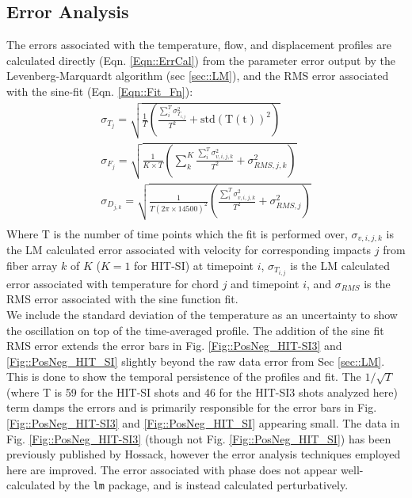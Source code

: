 \subsection{Error Analysis}\label{sec:ErrorAnal}
\hspace*{4ex}The errors associated with the temperature, flow, and displacement profiles are calculated directly (Eqn. \ref{Eqn::ErrCal}) from the parameter error output by the Levenberg-Marquardt algorithm (sec \ref{sec::LM}), and the RMS error associated with the sine-fit (Eqn. \ref{Eqn::Fit_Fn}):
\begin{equation}\label{Eqn::ErrCal}
\begin{split}
\sigma_{T_j} = \sqrt{\frac{1}{T}\left(\frac{\sum_i^T\sigma_{T_{i,j}}^2}{T^2} + \mathrm{std(T(t))^2}\right)}\\
\sigma_{F_j}=\sqrt{\frac{1}{K\times{T}}\left(\sum_k^K\frac{\sum_i^T\sigma_{v,i,j,k}^2 }{T^2}+\sigma_{RMS,j,k}^2\right)}\\
\sigma_{D_{j,k}}=\sqrt{\frac{1}{T{\left(2\pi\times14500\right)^2}}\left(\frac{\sum_i^T\sigma_{v,i,j,k}^2}{T^2}+\sigma_{RMS,j}^2\right)}\\
\end{split}
\end{equation}
Where T is the number of time points which the fit is performed over, $\sigma_{v,i,j,k}$ is the LM calculated error associated with velocity for corresponding impacts $j$ from fiber array $k$ of $K$ ($K=1$ for HIT-SI) at timepoint $i$, $\sigma_{T_{i,j}}$ is the LM calculated error associated with temperature for chord $j$ and timepoint $i$, and $\sigma_{RMS}$ is the RMS error associated with the sine function fit.\\
\hspace*{4ex}We include the standard deviation of the temperature as an uncertainty to show the oscillation on top of the time-averaged profile. The addition of the sine fit RMS error extends the error bars in Fig. \ref{Fig::PosNeg_HIT-SI3} and \ref{Fig::PosNeg_HIT_SI} slightly beyond the raw data error from Sec \ref{sec::LM}. This is done to show the temporal persistence of the profiles and fit. The $1/\sqrt{T}$ (where T is 59 for the HIT-SI shots and 46 for the HIT-SI3 shots analyzed here) term damps the errors and is primarily responsible for the error bars in Fig. \ref{Fig::PosNeg_HIT-SI3} and \ref{Fig::PosNeg_HIT_SI} appearing small. The data in Fig. \ref{Fig::PosNeg_HIT-SI3} (though not Fig. \ref{Fig::PosNeg_HIT_SI}) has been previously published by Hossack\cite{Hossack_HitSi3}, however the error analysis techniques employed here are improved. The error associated with phase does not appear well-calculated by the \texttt{lm} package, and is instead calculated perturbatively. \\
